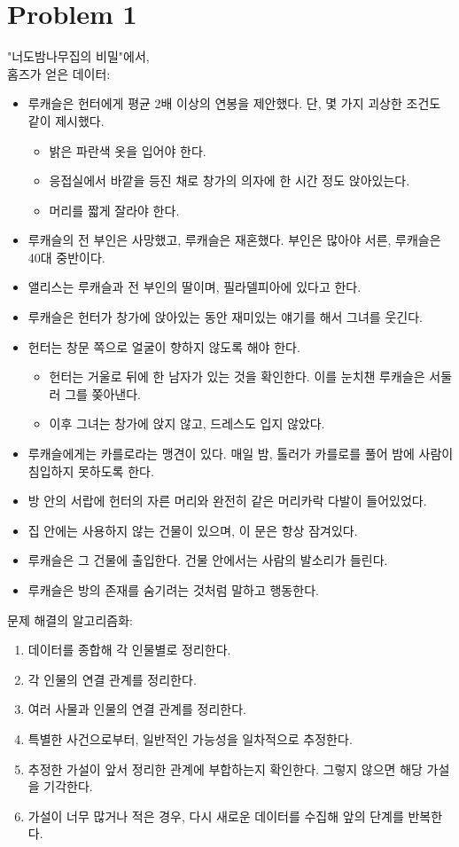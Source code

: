 \section*{Problem 1}
	"너도밤나무집의 비밀"에서,\\
	홈즈가 얻은 데이터:
	\begin{itemize}
		\item 루캐슬은 헌터에게 평균 2배 이상의 연봉을 제안했다. 단, 몇 가지 괴상한 조건도 같이 제시했다.
		\begin{itemize}
			\item 밝은 파란색 옷을 입어야 한다.
			\item 응접실에서 바깥을 등진 채로 창가의 의자에 한 시간 정도 앉아있는다.
			\item 머리를 짧게 잘라야 한다.
		\end{itemize}
		\item 루캐슬의 전 부인은 사망했고, 루캐슬은 재혼했다. 부인은 많아야 서른, 루캐슬은 40대 중반이다.
		\item 앨리스는 루캐슬과 전 부인의 딸이며, 필라델피아에 있다고 한다.
		\item 루캐슬은 헌터가 창가에 앉아있는 동안 재미있는 얘기를 해서 그녀를 웃긴다.
		\item 헌터는 창문 쪽으로 얼굴이 향하지 않도록 해야 한다.
		\begin{itemize}
			\item 헌터는 거울로 뒤에 한 남자가 있는 것을 확인한다. 이를 눈치챈 루캐슬은 서둘러 그를 쫒아낸다.
			\item 이후 그녀는 창가에 앉지 않고, 드레스도 입지 않았다.
		\end{itemize}
		\item 루캐슬에게는 카를로라는 맹견이 있다. 매일 밤, 톨러가 카를로를 풀어 밤에 사람이 침입하지 못하도록 한다.
		\item 방 안의 서랍에 헌터의 자른 머리와 완전히 같은 머리카락 다발이 들어있었다.
		\item 집 안에는 사용하지 않는 건물이 있으며, 이 문은 항상 잠겨있다.
		\item 루캐슬은 그 건물에 출입한다. 건물 안에서는 사람의 발소리가 들린다.
		\item 루캐슬은 방의 존재를 숨기려는 것처럼 말하고 행동한다.
	\end{itemize}
	문제 해결의 알고리즘화:
	\begin{enumerate}
		\item 데이터를 종합해 각 인물별로 정리한다.
		\item 각 인물의 연결 관계를 정리한다.
		\item 여러 사물과 인물의 연결 관계를 정리한다.
		\item 특별한 사건으로부터, 일반적인 가능성을 일차적으로 추정한다.
		\item 추정한 가설이 앞서 정리한 관계에 부합하는지 확인한다. 그렇지 않으면 해당 가설을 기각한다.
		\item 가설이 너무 많거나 적은 경우, 다시 새로운 데이터를 수집해 앞의 단계를 반복한다.
	\end{enumerate}
